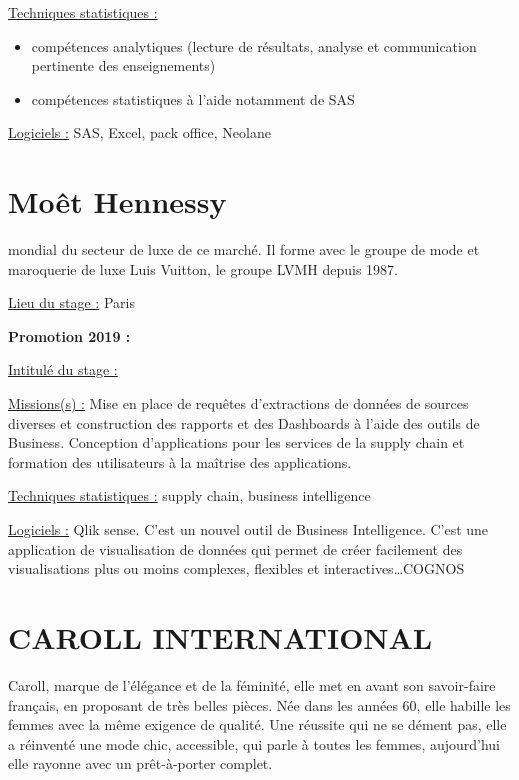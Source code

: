 \documentclass[
  letterpaper,
  DIV=11,
  numbers=noendperiod]{scrreprt}
\begin{document}
\uline{Techniques statistiques :}

\begin{itemize}
\item
  compétences analytiques (lecture de résultats, analyse et
  communication pertinente des enseignements)
\item
  compétences statistiques à l'aide notamment de SAS
\end{itemize}

\uline{Logiciels :} SAS, Excel, pack office, Neolane

\hypertarget{mouxeat-hennessy}{%
\section{\texorpdfstring{\textbf{Moêt
Hennessy}}{Moêt Hennessy}}\label{mouxeat-hennessy}}

mondial du secteur de luxe de ce marché. Il forme avec le groupe de mode
et maroquerie de luxe Luis Vuitton, le groupe LVMH depuis 1987.

\uline{Lieu du stage :} Paris

\textbf{Promotion 2019 :}

\uline{Intitulé du stage :}

\uline{Missions(s) :} Mise en place de requêtes d'extractions de données
de sources diverses et construction des rapports et des Dashboards à
l'aide des outils de Business. Conception d'applications pour les
services de la supply chain et formation des utilisateurs à la maîtrise
des applications.

\uline{Techniques statistiques :} supply chain, business intelligence

\uline{Logiciels :} Qlik sense. C'est un nouvel outil de Business
Intelligence. C'est une application de visualisation de données qui
permet de créer facilement des visualisations plus ou moins complexes,
flexibles et interactives\ldots COGNOS

\hypertarget{caroll-international}{%
\section{\texorpdfstring{\textbf{CAROLL
INTERNATIONAL}}{CAROLL INTERNATIONAL}}\label{caroll-international}}

Caroll, marque de l'élégance et de la féminité, elle met en avant son
savoir-faire français, en proposant de très belles pièces. Née dans les
années 60, elle habille les femmes avec la même exigence de qualité. Une
réussite qui ne se dément pas, elle a réinventé une mode chic,
accessible, qui parle à toutes les femmes, aujourd'hui elle rayonne avec
un prêt-à-porter complet.
\end{document}
